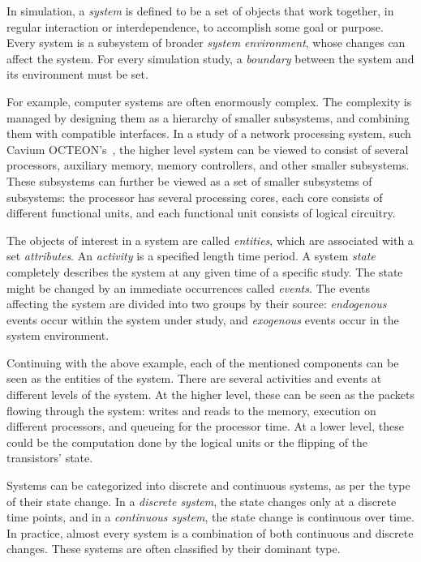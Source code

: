 In simulation, a \emph{system} is defined to be a set of objects that work together, in regular interaction or interdependence, to accomplish some goal or purpose. Every system is a subsystem of broader \emph{system environment}, whose changes can affect the system. For every simulation study, a \emph{boundary} between the system and its environment must be set.~\cite{Banks:2010:DES}

For example, computer systems are often enormously complex. The complexity is managed by designing them as a hierarchy of smaller subsystems, and combining them with compatible interfaces. In a study of a network processing system, such Cavium OCTEON's~\cite{cavium:2010:fundamentals}, the higher level system can be viewed to consist of several processors, auxiliary memory, memory controllers, and other smaller subsystems. These subsystems can further be viewed as a set of smaller subsystems of subsystems: the processor has several processing cores, each core consists of different functional units, and each functional unit consists of logical circuitry.~\cite{Banks:2010:DES}

The objects of interest in a system are called \emph{entities}, which are associated with a set \emph{attributes}. An \emph{activity} is a specified length time period. A system \emph{state} completely describes the system at any given time of a specific study. The state might be changed by an immediate occurrences called \emph{events}. The events affecting the system are divided into two groups by their source: \emph{endogenous} events occur within the system under study, and \emph{exogenous} events occur in the system environment.~\cite{Banks:2010:DES}

Continuing with the above example, each of the mentioned components can be seen as the entities of the system. There are several activities and events at different levels of the system. At the higher level, these can be seen as the packets flowing through the system: writes and reads to the memory, execution on different processors, and queueing for the processor time. At a lower level, these could be the computation done by the logical units or the flipping of the transistors' state.

Systems can be categorized into discrete and continuous systems, as per the type of their state change. In a \emph{discrete system}, the state changes only at a discrete time points, and in a \emph{continuous system}, the state change is continuous over time. In practice, almost every system is a combination of both continuous and discrete changes. These systems are often classified by their dominant type.~\cite{Banks:2010:DES}

